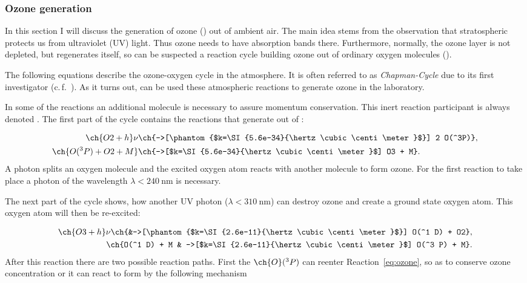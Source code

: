 \subsubsection{Ozone generation}
\label{sec:theory-ozone}

In this section I will discuss the generation of ozone () out of ambient
air. The main idea stems from the observation that stratospheric
 protects us from ultraviolet (UV) light. Thus ozone needs to
have absorption bands there. Furthermore, normally, the ozone layer is
not depleted, but regenerates itself, so can be suspected a reaction
cycle building ozone out of ordinary oxygen molecules ().

The following equations describe the ozone-oxygen cycle in the
atmosphere.  It is often referred to as \emph{Chapman-Cycle} due to
its first investigator (c.\,f.~\cite{chapman,roedel}). As it turns
out, can be used these atmospheric reactions to generate ozone in the
laboratory.

In some of the reactions an additional molecule is necessary to assure
momentum conservation. This inert reaction participant is always
denoted . The first part of the cycle contains the reactions
that generate  out of :

\begin{align}
  \ch{O2 + h}\nu &\ch{->[\phantom{$k=\SI{5.6e-34}{\hertz\cubic\centi\meter}$}] 2 O(^3P)},\nonumber\\
  \ch{O(^3 P) + O2 + M} &\ch{->[$k=\SI{5.6e-34}{\hertz\cubic\centi\meter}$] O3 + M}. \label{eq:ozone}
\end{align}
A photon splits an oxygen molecule and the excited oxygen atom reacts
with another  molecule to form ozone. For the first reaction to
take place a photon of the wavelength
$\lambda < \SI{240}{\nano\meter}$ is necessary.

The next part of the cycle shows, how another UV photon ($\lambda <
\SI{310}{\nano\meter}$) can destroy
ozone and create a ground state oxygen atom. This oxygen atom will
then be re-excited:

\begin{align}
  \ch{O3 + h}\nu \ch{&->[\phantom{$k=\SI{2.6e-11}{\hertz\cubic\centi\meter}$}] O(^1 D) +
  O2}, \label{eq:split}\\
  \ch{O(^1 D) + M & ->[$k=\SI{2.6e-11}{\hertz\cubic\centi\meter}$] O(^3 P) + M}.\nonumber
\end{align}
After this reaction there are two possible reaction paths. First the
$\ch{O}(^3 P)$ can reenter Reaction~\eqref{eq:ozone}, so as to
conserve ozone concentration or it can react to form  by the
following mechanism

